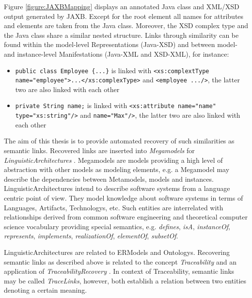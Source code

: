 Figure \ref{figure:JAXBMapping} displays an annotated \gls{Java} class and \gls{XML}/\gls{XSD} output generated by \gls{JAXB}.
Except for the root element all names for attributes and elements are taken from the \gls{Java} class.
Moreover, the \gls{XSD} complex type and the \gls{Java} class share a similar nested structure.
Links through similarity can be found within the model-level \glspl{Representation} (\gls{Java}-\gls{XSD}) and between model- and instance-level \glspl{Manifestation} (\gls{Java}-\gls{XML} and \gls{XSD}-\gls{XML}), for instance:
\begin{itemize}
\item
\texttt{public class Employee \{...\}} is linked with \texttt{<xs:complextType name="employee">...</xs:complexType>}
and \texttt{<employee .../>}, the latter two are also linked with each other

\item
\texttt{private String name;} is linked with \texttt{<xs:attribute name="name" type="xs:string"/>} and \texttt{name="Max"/>}, the latter two are also linked with each other
\end{itemize}

The aim of this thesis is to provide automated recovery of such similarities as semantic links.
Recovered links are inserted into \textit{\glspl{Megamodel}} \cite{DBLP:conf/sattose/BaggeZ14} \cite{DBLP:journals/entcs/FavreN05} for \textit{\glspl{LinguisticArchitecture}} \cite{DBLP:conf/models/FavreLV12} \cite{DBLP:conf/ecmdafa/LammelV14} \cite{HeinzLV17}.
\Glspl{Megamodel} are models providing a high level of abstraction with other models as modeling elements, e.g. a \gls{Megamodel} may describe the dependencies between \glspl{Metamodel}, models and instances.
\Glspl{LinguisticArchitecture} intend to describe software systems from a language centric point of view.
They model knowledge about software systems in terms of \glspl{Language}, \glspl{Artifact}, \glspl{Technology}, etc.
Such entities are interrelated with relationships derived from common software engineering and theoretical computer science vocabulary providing special semantics, e.g. \textit{defines}, \textit{isA}, \textit{instanceOf}, \textit{represents}, \textit{implements}, \textit{realizationOf}, \textit{elementOf}, \textit{subsetOf}.

\Glspl{LinguisticArchitecture} are related to \glspl{ERModel} and \glspl{Ontology}.
Recovering semantic links as described above is related to the concept \textit{\gls{Traceability}} and an application of \textit{\gls{TraceabilityRecovery}} \cite{DBLP:books/daglib/p/GotelCHZEGDAMM12}.
In context of \gls{Traceability}, semantic links may be called \textit{\glspl{TraceLink}}, however, both establish a relation between two entities denoting a certain meaning.

